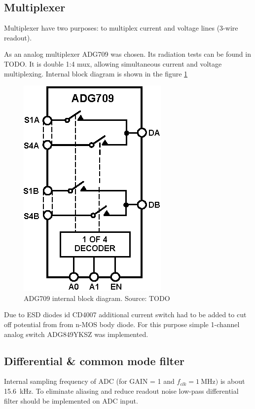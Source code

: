     \subsection{Multiplexer}
        Multiplexer have two purposes: to multiplex current and voltage lines (3-wire readout).

        As an analog multiplexer ADG709 was chosen. Its radiation tests can be found in TODO. It is double 1:4 mux, allowing simultaneous current and voltage multiplexing. Internal block diagram is shown in the figure \ref{ADG709_block}

        \begin{figure}[H]
            \centering
            \includegraphics[width=0.3\paperwidth]{img/06/ADG709.eps}
            \caption{ADG709 internal block diagram. Source: TODO}
            \label{ADG709_block}
        \end{figure}

        Due to ESD diodes id CD4007 additional current switch had to be added to cut off potential from from n-MOS body diode. For this purpose simple 1-channel analog switch ADG849YKSZ was implemented.

    \subsection{Differential \& common mode filter}
        Internal sampling frequency of ADC (for GAIN = 1 and $f_{clk} = \SI{1}{\mega\hertz})$ is about \SI{15.6}{\kilo\hertz}. To eliminate aliasing and reduce readout noise low-pass differential filter should be implemented on ADC input.


